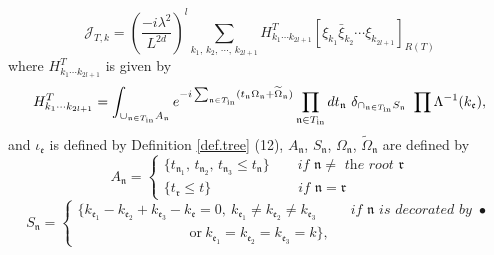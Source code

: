 \begin{lem}
\begin{equation}\label{eq.coefterm}
\mathcal{J}_{T,k}=\left(\frac{-i\lambda^2}{L^{2d}}\right)^l\sum_{k_1,\, k_2,\, \cdots,\, k_{2l+1}} H^T_{k_1\cdots k_{2l+1}} [\xi_{k_1}\bar{\xi}_{k_2}\cdots\xi_{k_{2l+1}}]_{R(T)} 
\end{equation}
where $H^T_{k_1\cdots k_{2l+1}}$ is given by
\begin{equation}\label{eq.coef}
H^T_{k_1\cdots k_{2l+1}}=\int_{\cup_{\mathfrak{n}\in T_{\text{in}}} A_{\mathfrak{n}}} e^{-i\sum_{\mathfrak{n}\in T_{\text{in}}} %
(t_{\mathfrak{n}}\Omega_{\mathfrak{n}}+\widetilde{\Omega}_{\mathfrak{n}})} \prod_{\mathfrak{n}\in T_{\text{in}}} dt_{\mathfrak{n}} %
\ \delta_{\cap_{\mathfrak{n}\in T_{\text{in}}} S_{\mathfrak{n}}}\ \prod_{%
}\Lambda^{-1}(k_{\mathfrak{e}}) ,
\end{equation}
and $ \iota_{\mathfrak{e}}$ is defined by Definition \ref{def.tree} (12), $A_{\mathfrak{n}}$, $S_{\mathfrak{n}}$, $\Omega_{\mathfrak{n}}$, $\widetilde{\Omega}_{\mathfrak{n}}$ are defined by 
\begin{equation}
 A_{\mathfrak{n}}=
 \begin{cases}
 \{t_{\mathfrak{n}_1},\, t_{\mathfrak{n}_2},\, t_{\mathfrak{n}_3}\le t_{\mathfrak{n}}\} \qquad \textit{if }\mathfrak{n}\ne\textit{ the root }\mathfrak{r}
 \\
 \{t_{\mathfrak{r}}\le t\} \qquad\qquad\qquad\  \textit{if }\mathfrak{n}= \mathfrak{r}
 \end{cases}
\end{equation}
\begin{equation}
 S_{\mathfrak{n}}=
 \begin{cases}
 \{k_{\mathfrak{e}_1}-k_{\mathfrak{e}_2}+k_{\mathfrak{e}_3}-k_{\mathfrak{e}}=0,\ k_{\mathfrak{e}_1}\ne k_{\mathfrak{e}_2}\ne k_{\mathfrak{e}_3} \qquad \ \  \textit{if }\mathfrak{n}\textit{ is decorated by }\bullet
 \\
 \qquad\qquad\qquad\qquad\text{or}\ k_{\mathfrak{e}_1}= k_{\mathfrak{e}_2}= k_{\mathfrak{e}_3}=k\}, 

\end{cases}
\end{equation}
\end{lem}
